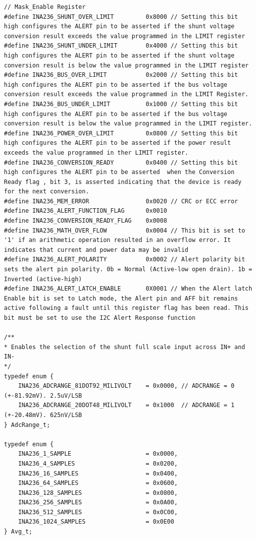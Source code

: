 \documentclass[
10pt, %
a4paper, %
oneside, %
headinclude,footinclude, %
BCOR5mm, %
]{scrartcl}
\begin{document}
\begin{lstlisting}[firstnumber=1,style=CStyle]
// Mask_Enable Register
#define INA236_SHUNT_OVER_LIMIT         0x8000 // Setting this bit high configures the ALERT pin to be asserted if the shunt voltage conversion result exceeds the value programmed in the LIMIT register
#define INA236_SHUNT_UNDER_LIMIT        0x4000 // Setting this bit high configures the ALERT pin to be asserted if the shunt voltage conversion result is below the value programmed in the LIMIT register 
#define INA236_BUS_OVER_LIMIT           0x2000 // Setting this bit high configures the ALERT pin to be asserted if the bus voltage conversion result exceeds the value programmed in the LIMIT Register.
#define INA236_BUS_UNDER_LIMIT          0x1000 // Setting this bit high configures the ALERT pin to be asserted if the bus voltage conversion result is below the value programmed in the LIMIT register.
#define INA236_POWER_OVER_LIMIT         0x0800 // Setting this bit high configures the ALERT pin to be asserted if the power result exceeds the value programmed in ther LIMIT register.
#define INA236_CONVERSION_READY         0x0400 // Setting this bit high configures the ALERT pin to be asserted  when the Conversion Ready flag , bit 3, is asserted indicating that the device is ready for the next conversion.
#define INA236_MEM_ERROR                0x0020 // CRC or ECC error
#define INA236_ALERT_FUNCTION_FLAG      0x0010  
#define INA236_CONVERSION_READY_FLAG    0x0008
#define INA236_MATH_OVER_FLOW           0x0004 // This bit is set to '1' if an arithmetic operation resulted in an overflow error. It indicates that current and power data may be invalid
#define INA236_ALERT_POLARITY           0x0002 // Alert polarity bit sets the alert pin polarity. 0b = Normal (Active-low open drain). 1b = Inverted (active-high)
#define INA236_ALERT_LATCH_ENABLE       0X0001 // When the Alert latch Enable bit is set to Latch mode, the Alert pin and AFF bit remains active following a fault until this register flag has been read. This bit must be set to use the I2C Alert Response function   

/**
* Enables the selection of the shunt full scale input across IN+ and IN-
*/
typedef enum {
	INA236_ADCRANGE_81DOT92_MILIVOLT    = 0x0000, // ADCRANGE = 0 (+-81.92mV). 2.5uV/LSB
	INA236_ADCRANGE_20DOT48_MILIVOLT    = 0x1000  // ADCRANGE = 1 (+-20.48mV). 625nV/LSB      
} AdcRange_t;

typedef enum { 
	INA236_1_SAMPLE                     = 0x0000,
	INA236_4_SAMPLES                    = 0x0200,
	INA236_16_SAMPLES                   = 0x0400,
	INA236_64_SAMPLES                   = 0x0600,
	INA236_128_SAMPLES                  = 0x0800,
	INA236_256_SAMPLES                  = 0x0A00, 
	INA236_512_SAMPLES                  = 0x0C00,
	INA236_1024_SAMPLES                 = 0x0E00
} Avg_t;


\end{lstlisting}
\end{document}
